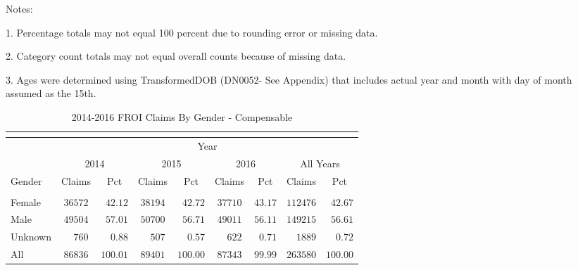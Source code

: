 \documentclass[9pt, oneside]{article}   	%
\begin{document}
    \begin{tablenotes}
      \small
      Notes:\\
      \item 1. Percentage totals may not equal 100 percent due to rounding error or missing data.\\
      \item 2. Category count totals may not equal overall counts because of missing data.\\
      \item 3. Ages were determined using TransformedDOB (DN0052- See Appendix) that includes actual year and month with day of month assumed as the 15th.
      \end{tablenotes}


\pagebreak

\begin{longtable}{lcccccccc}
\caption{2014-2016 FROI Claims By Gender - Compensable}\\
\label{Table: Six}\\
 \hline
                  \toprule
 & \multicolumn{8}{c}{Year} \\ 
 & \multicolumn{2}{c}{2014} & \multicolumn{2}{c}{2015} & \multicolumn{2}{c}{2016} & \multicolumn{2}{c}{All Years} \\ 
Gender  & Claims & Pct & Claims & Pct & Claims & Pct & Claims & \multicolumn{1}{c}{Pct} \\ 
\midrule\\ [-1\normalbaselineskip]\hline\endhead\hline\endfoot
Female  & $36572$ & $\phantom{0}42.12$ & $38194$ & $\phantom{0}42.72$ & $37710$ & $43.17$ & $112476$ & $\phantom{0}42.67$ \\
Male  & $49504$ & $\phantom{0}57.01$ & $50700$ & $\phantom{0}56.71$ & $49011$ & $56.11$ & $149215$ & $\phantom{0}56.61$ \\
Unknown  & $\phantom{00}760$ & $\phantom{00}0.88$ & $\phantom{00}507$ & $\phantom{00}0.57$ & $\phantom{00}622$ & $\phantom{0}0.71$ & $\phantom{00}1889$ & $\phantom{00}0.72$ \\
\cline{1-1} \cline{2-2} \cline{3-3} \cline{4-4} \cline{5-5} \cline{6-6} \cline{7-7} \cline{8-8} \cline{9-9} %
All  & $86836$ & $100.01$ & $89401$ & $100.00$ & $87343$ & $99.99$ & $263580$ & $100.00$ \\
\hline 
\end{longtable}



\pagebreak
\end{document}
